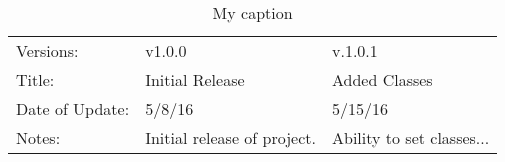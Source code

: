 \begin{table}[]
\centering
\caption{My caption}
\label{my-label}
\begin{tabular}{|l|l|l|}
\cline{1-1} \cline{3-3}
Versions:       & v1.0.0                      & v.1.0.1                   \\ \cline{1-1} \cline{3-3}
Title:          & Initial Release             & Added Classes             \\ \cline{1-1} \cline{3-3}
Date of Update: & 5/8/16                      & 5/15/16                   \\ \cline{1-1} \cline{3-3}
Notes:          & Initial release of project. & Ability to set classes... \\ \cline{1-1} \cline{3-3}
\end{tabular}
\end{table}
